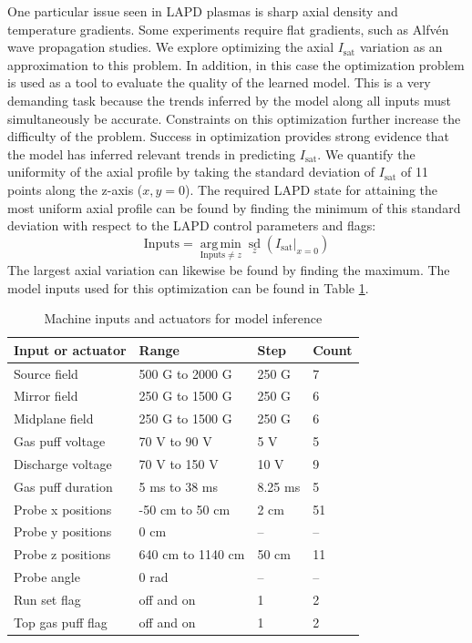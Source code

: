 
One particular issue seen in LAPD plasmas is sharp axial density and temperature gradients. Some experiments require flat gradients, such as Alfv\'en wave propagation studies. We explore optimizing the axial $I_\text{sat}$ variation as an approximation to this problem. 
In addition, in this case the optimization problem is used as a tool to evaluate the quality of the learned model. This is a very demanding task because the trends inferred by the model along all inputs must simultaneously be accurate. Constraints on this optimization further increase the difficulty of the problem. Success in optimization provides strong evidence that the model has inferred relevant trends in predicting $I_\text{sat}$.
We quantify the uniformity of the axial profile by taking the standard deviation of $I_\text{sat}$ of 11 points along the z-axis ($x,y=0$). The required LAPD state for attaining the most uniform axial profile can be found by finding the minimum of this standard deviation with respect to the LAPD control parameters and flags:
\begin{equation}
	\text{Inputs} = \operatorname*{arg\,min}_{\text{Inputs} \neq z} \operatorname*{sd}_{z}(I_\text{sat}|_{x=0})
\end{equation}
The largest axial variation can likewise be found by finding the maximum. The model inputs used for this optimization can be found in Table \ref{tab:axial_optimization_inputs}. 

\begin{table}
	\small
	\centering
	\caption{Machine inputs and actuators for model inference}
	\label{tab:axial_optimization_inputs}
	\begin{tabular}{l l l l}
		Input or actuator & Range & Step & Count \\
		\hline
		Source field & 500 G to 2000 G & 250 G & 7 \\
		Mirror field & 250 G to 1500 G & 250 G & 6 \\
		Midplane field & 250 G to 1500 G & 250 G & 6 \\
		Gas puff voltage & 70 V to 90 V & 5 V & 5 \\
		Discharge voltage & 70 V to 150 V & 10 V & 9 \\
		Gas puff duration & 5 ms to 38 ms & 8.25 ms & 5\\
		Probe x positions & -50 cm to 50 cm & 2 cm & 51 \\
		Probe y positions & 0 cm & -- & -- \\
		Probe z positions & 640 cm to 1140 cm & 50 cm & 11 \\
		Probe angle & 0 rad & -- & --\\
		Run set flag & off and on & 1 & 2 \\
		Top gas puff flag & off and on & 1 & 2\\
		
	\end{tabular}
\end{table}

